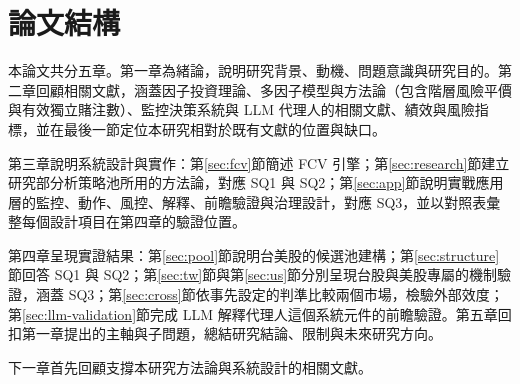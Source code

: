 \section{論文結構}\label{sec:thesis-structure}

本論文共分五章。第一章為緒論，說明研究背景、動機、問題意識與研究目的。第二章回顧相關文獻，涵蓋因子投資理論、多因子模型與方法論（包含階層風險平價與有效獨立賭注數）、監控決策系統與 LLM 代理人的相關文獻、績效與風險指標，並在最後一節定位本研究相對於既有文獻的位置與缺口。

第三章說明系統設計與實作：第\ref{sec:fcv}節簡述 FCV 引擎；第\ref{sec:research}節建立研究部分析策略池所用的方法論，對應 SQ1 與 SQ2；第\ref{sec:app}節說明實戰應用層的監控、動作、風控、解釋、前瞻驗證與治理設計，對應 SQ3，並以對照表彙整每個設計項目在第四章的驗證位置。

第四章呈現實證結果：第\ref{sec:pool}節說明台美股的候選池建構；第\ref{sec:structure}節回答 SQ1 與 SQ2；第\ref{sec:tw}節與第\ref{sec:us}節分別呈現台股與美股專屬的機制驗證，涵蓋 SQ3；第\ref{sec:cross}節依事先設定的判準比較兩個市場，檢驗外部效度；第\ref{sec:llm-validation}節完成 LLM 解釋代理人這個系統元件的前瞻驗證。第五章回扣第一章提出的主軸與子問題，總結研究結論、限制與未來研究方向。

下一章首先回顧支撐本研究方法論與系統設計的相關文獻。
